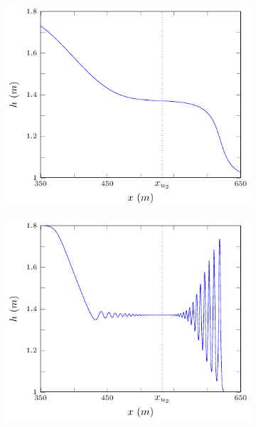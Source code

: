 \documentclass[times]{elsarticle}
\begin{document}
\begin{figure}
	\centering
	\begin{subfigure}{0.5\textwidth}
		\includegraphics[width=\textwidth]{pics/results/SDB/structs/non.pdf}
	\end{subfigure}%
	\begin{subfigure}{0.5\textwidth}
		\includegraphics[width=\textwidth]{pics/results/SDB/structs/flat.pdf}

\end{subfigure}
\end{figure}
\end{document}
